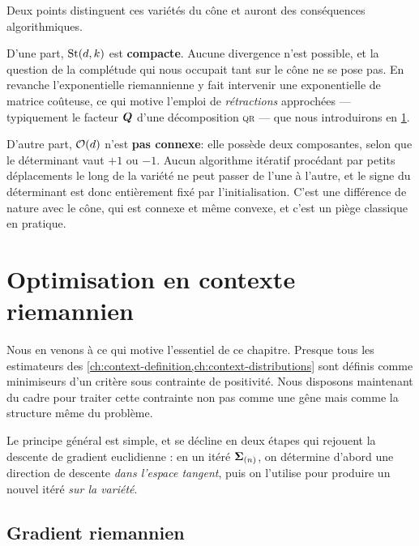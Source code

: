 \begin{remark}
\label{rem:context-riemann-stiefelvscone}
  Deux points distinguent ces variétés du cône et auront des conséquences algorithmiques.

  D'une part, $\mathrm{St}(d,k)$ est \textbf{compacte}. Aucune divergence n'est possible, et la question de la complétude qui nous occupait tant sur le cône ne se pose pas. En revanche l'exponentielle riemannienne y fait intervenir une exponentielle de matrice coûteuse, ce qui motive l'emploi de \emph{rétractions} approchées --- typiquement le facteur $\boldsymbol{Q}$ d'une décomposition \textsc{qr} --- que nous introduirons en \cref{sec:context-riemann-optimization}.

  D'autre part, $\mathcal{O}(d)$ n'est \textbf{pas connexe}: elle possède deux composantes, selon que le déterminant vaut $+1$ ou $-1$. Aucun algorithme itératif procédant par petits déplacements le long de la variété ne peut passer de l'une à l'autre, et le signe du déterminant est donc entièrement fixé par l'initialisation. C'est une différence de nature avec le cône, qui est connexe et même convexe, et c'est un piège classique en pratique.
\end{remark}


\section{Optimisation en contexte riemannien}
\label{sec:context-riemann-optimization}

Nous en venons à ce qui motive l'essentiel de ce chapitre. Presque tous les estimateurs des \cref{ch:context-definition,ch:context-distributions} sont définis comme minimiseurs d'un critère sous contrainte de positivité. Nous disposons maintenant du cadre pour traiter cette contrainte non pas comme une gêne mais comme la structure même du problème.

Le principe général est simple, et se décline en deux étapes qui rejouent la descente de gradient euclidienne : en un itéré $\boldsymbol{\Sigma}_{(n)}$, on détermine d'abord une direction de descente \emph{dans l'espace tangent}, puis on l'utilise pour produire un nouvel itéré \emph{sur la variété}.

\subsection{Gradient riemannien}

